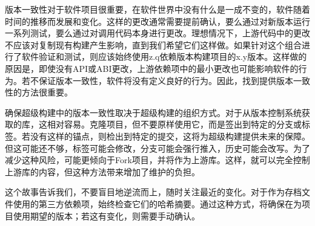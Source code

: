 
版本一致性对于软件项目很重要，在软件世界中没有什么是一成不变的，软件随着时间的推移而发展和变化。这样的更改通常需要提前确认，要么通过对新版本运行一系列测试，要么通过对调用代码本身进行更改。理想情况下，上游代码中的更改不应该对复制现有构建产生影响，直到我们希望它们这样做。如果针对这个组合进行了软件验证和测试，则应该始终使用z.q依赖版本构建项目的x.y版本。这样做的原因是，即使没有API或ABI更改，上游依赖项中的最小更改也可能影响软件的行为。若不保证版本一致性，软件将没有定义良好的行为。因此，找到提供版本一致性的方法很重要。

确保超级构建中的版本一致性取决于超级构建的组织方式。对于从版本控制系统获取的库，这相对容易。克隆项目，但不要原样使用它，而是签出到特定的分支或标签。若没有这样的锚点，则检出到特定的提交，这将为超级构建提供未来的保障。但这可能还不够，标签可能会修改，分支可能会强行推入，历史可能会改写。为了减少这种风险，可能更倾向于Fork项目，并将作为上游库。这样，就可以完全控制上游库的内容，但这种方法带来增加了维护的负担。

这个故事告诉我们，不要盲目地逆流而上，随时关注最近的变化。对于作为存档文件使用的第三方依赖项，始终检查它们的哈希摘要。通过这种方式，将确保在为项目使用期望的版本；若这有变化，则需要手动确认。












































